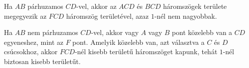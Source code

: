\documentclass[a4paper,10pt]{article}
\begin{document}
Ha $AB$ párhuzamos $CD$-vel, akkor az $ACD$ és $BCD$ háromszögek területe megegyezik az $FCD$ háromszög területével, azaz $1$-nél nem nagyobbak.

Ha $AB$ nem párhuzamos $CD$-vel, akkor vagy $A$ vagy $B$ pont közelebb van a $CD$ egyeneshez, mint az $F$ pont. Amelyik közelebb van, azt választva a $C$ és $D$ csúcsokhoz, akkor $FCD$-nél kisebb területű háromszöget kapunk, tehát $1$-nél biztosan kisebb területűt.
\medskip

\vfill
\end{document}
